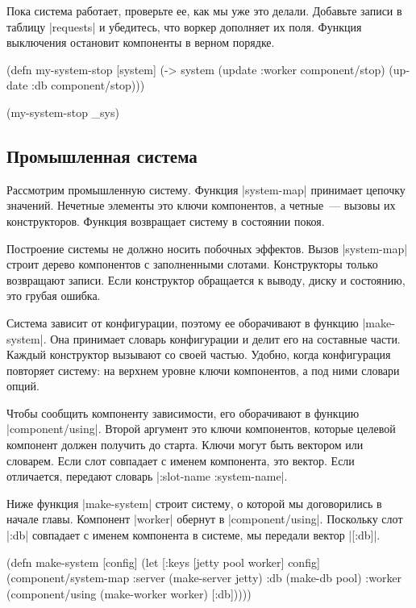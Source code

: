 Пока система работает, проверьте ее, как мы уже это делали. Добавьте записи в
таблицу \spverb|requests| и убедитесь, что воркер дополняет их поля. Функция
выключения остановит компоненты в верном порядке.

\begin{english}
  \begin{clojure}
(defn my-system-stop
  [system]
  (-> system
      (update :worker component/stop)
      (update :db component/stop)))

(my-system-stop _sys)
  \end{clojure}
\end{english}

\subsection{Промышленная система}

Рассмотрим промышленную систему. Функция \spverb|system-map| принимает цепочку
значений. Нечетные элементы это ключи компонентов, а четные~--- вызовы их
конструкторов. Функция возвращает систему в состоянии покоя.

Построение системы не должно носить побочных эффектов. Вызов \spverb|system-map|
строит дерево компонентов с заполненными слотами. Конструкторы только возвращают
записи. Если конструктор обращается к выводу, диску и состоянию, это грубая
ошибка.

Система зависит от конфигурации, поэтому ее оборачивают в функцию
\spverb|make-system|. Она принимает словарь конфигурации и делит его на
составные части. Каждый конструктор вызывают со своей частью. Удобно, когда
конфигурация повторяет систему: на верхнем уровне ключи компонентов, а под ними
словари опций.

Чтобы сообщить компоненту зависимости, его оборачивают в функцию
\spverb|component/using|. Второй аргумент это ключи компонентов, которые целевой
компонент должен получить до старта. Ключи могут быть вектором или
словарем. Если слот совпадает с именем компонента, это вектор. Если отличается,
передают словарь \spverb|{:slot-name :system-name}|.

Ниже функция \spverb|make-system| строит систему, о которой мы договорились в
начале главы. Компонент \spverb|worker| обернут в
\spverb|component/using|. Поскольку слот \spverb|:db| совпадает с именем
компонента в системе, мы передали вектор \spverb|[:db]|.

\begin{english}
  \begin{clojure}
(defn make-system
  [config]
  (let [{:keys [jetty pool worker]} config]
    (component/system-map
     :server (make-server jetty)
     :db     (make-db pool)
     :worker (component/using
              (make-worker worker) [:db]))))
  \end{clojure}
\end{english}

